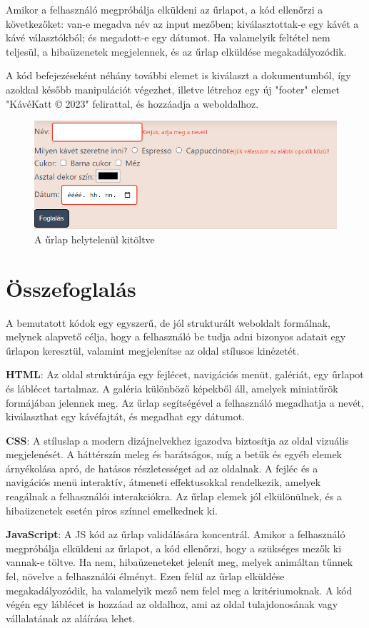 \documentclass{article}
\begin{document}
Amikor a felhasználó megpróbálja elküldeni az űrlapot, a kód ellenőrzi a következőket: van-e megadva név az input mezőben; kiválasztottak-e egy kávét a kávé választókból; és megadott-e egy dátumot. Ha valamelyik feltétel nem teljesül, a hibaüzenetek megjelennek, és az űrlap elküldése megakadályozódik.

A kód befejezéseként néhány további elemet is kiválaszt a dokumentumból, így azokkal később manipulációt végezhet, illetve létrehoz egy új "footer" elemet "KávéKatt © 2023" felirattal, és hozzáadja a weboldalhoz.

\begin{figure}[H]
	\centering
	\includegraphics[width=0.8\linewidth]{badform.png}
	\caption{A űrlap helytelenül kitöltve}
	\label{fig:badform}
\end{figure}
\clearpage

\section{Összefoglalás}
A bemutatott kódok egy egyszerű, de jól strukturált weboldalt formálnak, melynek alapvető célja, hogy a felhasználó be tudja adni bizonyos adatait egy űrlapon keresztül, valamint megjelenítse az oldal stílusos kinézetét.

\noindent \textbf{HTML}: Az oldal struktúrája egy fejlécet, navigációs menüt, galériát, egy űrlapot és láblécet tartalmaz. A galéria különböző képekből áll, amelyek miniatűrök formájában jelennek meg. Az űrlap segítségével a felhasználó megadhatja a nevét, kiválaszthat egy kávéfajtát, és megadhat egy dátumot.

\noindent \textbf{CSS}: A stíluslap a modern dizájnelvekhez igazodva biztosítja az oldal vizuális megjelenését. A háttérszín meleg és barátságos, míg a betűk és egyéb elemek árnyékolása apró, de hatásos részletességet ad az oldalnak. A fejléc és a navigációs menü interaktív, átmeneti effektusokkal rendelkezik, amelyek reagálnak a felhasználói interakciókra. Az űrlap elemek jól elkülönülnek, és a hibaüzenetek esetén piros színnel emelkednek ki.

\noindent \textbf{JavaScript}: A JS kód az űrlap validálására koncentrál. Amikor a felhasználó megpróbálja elküldeni az űrlapot, a kód ellenőrzi, hogy a szükséges mezők ki vannak-e töltve. Ha nem, hibaüzeneteket jelenít meg, melyek animáltan tűnnek fel, növelve a felhasználói élményt. Ezen felül az űrlap elküldése megakadályozódik, ha valamelyik mező nem felel meg a kritériumoknak. A kód végén egy láblécet is hozzáad az oldalhoz, ami az oldal tulajdonosának vagy vállalatának az aláírása lehet.
\end{document}
